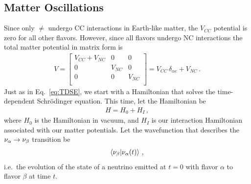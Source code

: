 \subsection{Matter Oscillations}
Since only $\ne$ undergo CC interactions in Earth-like matter, the $V_{CC}$ potential is zero for all other flavors. However, since all flavors undergo NC interactions the total matter potential in matrix form is
\begin{align}\label{eq:V_matrix}
    V = \begin{bmatrix}
        V_{CC} + V_{NC} & 0 & 0 \\
        0 & V_{NC} & 0 \\
        0 & 0 & V_{NC} \\
    \end{bmatrix} = V_{CC}\, \delta_{\alpha e} + V_{NC}\,.
\end{align}
Just as in Eq.~\ref{eq:TDSE}, we start with a Hamiltonian that solves the time-dependent Schrödinger equation. This time, let the Hamiltonian be 
\begin{align}
    H = H_0 + H_{I}\,,
\end{align}
where $H_0$ is the Hamiltonian in vacuum, and $H_{I}$ is our interaction Hamiltonian associated with our matter potentials.
Let the wavefunction that describes the $\nu_\alpha \to \nu_\beta$ transition be 
\begin{align}
    \bra{\nu_\beta}\ket{\nu_\alpha (t)}\,,
\end{align}
i.e.~the evolution of the state of a neutrino emitted at $t =0$ with flavor $\alpha$ to flavor $\beta$ at time $t$.

